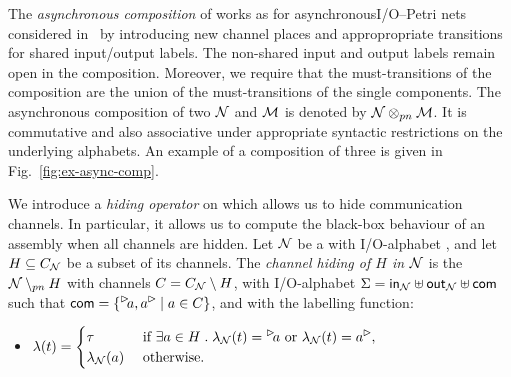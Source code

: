 The \emph{asynchronous composition} of \MAIOPNs works as for asynchronous\linebreak I/O--Petri nets considered in~\cite{haddad-et-al-2013}
by introducing new channel places and appropropriate transitions for shared input/output labels.
The non-shared  input and output labels remain open in the composition. 
Moreover, we require that the must-transitions of the composition are the union of the must-transitions of the single components. 
The asynchronous composition of two \MAIOPNs $\mathcal{N}$ and $\mathcal{M}$ is denoted by $\mathcal{N} \otimes_{pn} \mathcal{M}$.
It is commutative and also associative under appropriate syntactic restrictions on the underlying alphabets.
An example of a composition of three \MAIOPNs is given in Fig.~\ref{fig:ex-async-comp}.
%
%

We introduce a \emph{hiding operator} on \MAIOPNs which allows us to hide communication channels.
In particular, it allows us to compute the black-box behaviour of an assembly when all channels are hidden.
    Let $\mathcal{N}$ be a \MAIOPN with I/O-alphabet \ioalpha{\pnN}, and let $H \subseteq C_\mathcal{N}$ be a subset of its channels. The \emph{channel hiding of $H$ in $\mathcal{N}$} is the \MAIOPN $\mathcal{N} \setminus_{pn} H$ with channels $C = C_\mathcal{N} \setminus H$, with I/O-alphabet $\Sigma = \mathsf{in}_\mathcal{N} \uplus \mathsf{out}_\mathcal{N} \uplus \mathsf{com}$ such that $\com = \{\inact{a},\outact{a} \mid a \in \chan\}$, and with the labelling function:

 \begin{itemize}
         \item[~] $\lambda(t) = \begin{cases}
            \tau &\text{ if } \exists a \in H \;.\; \lambda_\pnN(t)= \inact{a} \text{ or } \lambda_\pnN(t)= \outact{a},\\
            \lambda_\pnN(a) & \text{ otherwise. }
        \end{cases}$
    \end{itemize}
